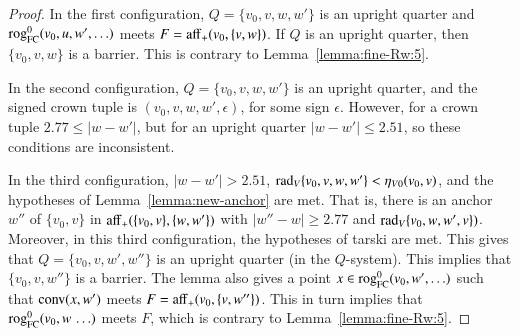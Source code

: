 \begin{proof}
In the first configuration, $Q=\{v_0,v,w,w'\}$ is an upright quarter and
${\operatorname{rog}}^0_{\text{FC}}(v_0,u,w',\ldots)$ meets $F = {\operatorname{aff}}_+(v_0,\{v,w\})$.  If $Q$ is an upright
quarter, then $\{v_0,v,w\}$ is a barrier.  This is contrary to Lemma~\ref{lemma:fine-Rw:5}.

In the second configuration, $Q=\{v_0,v,w,w'\}$ is an upright quarter, and the signed crown
tuple is $(v_0,v,w,w',\epsilon)$, for some sign $\epsilon$.  However, for a crown
tuple $2.77\le |w-w'|$, but for an upright quarter $|w-w'|\le 2.51$, so these conditions
are inconsistent.

In the third configuration, $|w-w'| > 2.51$, ${\operatorname{rad}}_V\{v_0,v,w,w'\} < \eta_{V0}(v_0,v)$,
and the hypotheses of Lemma~\ref{lemma:new-anchor} are met.  That is, there is an anchor
$w''$ of $\{v_0,v\}$ in ${\operatorname{aff}}_+(\{v_0,v\},\{w,w'\})$ with $|w''-w|\ge 2.77$
and $\operatorname{rad}_V\{v_0,w,w',v\})$.  Moreover, in this third configuration, the hypotheses of
tarski are met.  This gives that $Q=\{v_0,v,w',w''\}$ is an upright
quarter (in the $Q$-system).  This implies that $\{v_0,v,w''\}$ is a barrier.  The lemma
also gives a point $x \in {\operatorname{rog}}^0_{\text{FC}}(v_0,w',\ldots)$ such that ${\operatorname{conv}}(x,w')$ meets
$F={\operatorname{aff}}_+(v_0,\{v,w''\})$.  This in turn implies that ${\operatorname{rog}}^0_{\text{FC}}(v_0,w\,\ldots)$ meets $F$,
which is contrary to Lemma~\ref{lemma:fine-Rw:5}.
%
%
%
\end{proof}



